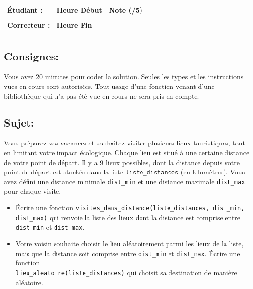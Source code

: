 \documentclass[a4paper,11pt]{article}
\begin{document}
\begin{table}[h!]
\centering
\renewcommand{\arraystretch}{1.4} %
\begin{tabular}{|p{10cm}|p{3cm}|p{2cm}|}
\hline
\textbf{Étudiant :} & \textbf{Heure Début }  & \textbf{Note (/5) }  \\
& & \\
\hline
\textbf{Correcteur :} & \textbf{Heure Fin } & \\
& & \\
\hline

\hline
\end{tabular}
\end{table}

\vspace*{-0.4 cm}
\subsection*{Consignes:} Vous avez 20 minutes pour coder la solution. Seules les types et les instructions vues en cours sont autorisées. Tout usage d'une fonction 
venant d'une bibliothèque qui n'a pas été vue en cours ne sera pris en compte. 

\vspace*{-0.2 cm}

\subsection*{Sujet:}   


Vous préparez vos vacances et souhaitez visiter plusieurs lieux touristiques, tout en limitant votre impact écologique.  
Chaque lieu est situé à une certaine distance de votre point de départ.  Il y a 9 lieux possibles, dont la distance depuis votre point de départ est stockée dans la liste \texttt{liste\_distances} (en kilomètres).  
Vous avez défini une distance minimale \texttt{dist\_min} et une distance maximale \texttt{dist\_max} pour chaque visite.

\begin{itemize}
\item[1.] Écrire une fonction 
\texttt{visites\_dans\_distance(liste\_distances, dist\_min, dist\_max)}  
qui renvoie la liste des lieux dont la distance est comprise entre \texttt{dist\_min} et \texttt{dist\_max}.
\item[2.] Votre voisin souhaite choisir le lieu aléatoirement parmi les lieux de la liste, mais que la distance soit comprise entre \texttt{dist\_min} et \texttt{dist\_max}.
Écrire une fonction \\
\texttt{lieu\_aleatoire(liste\_distances)} 
qui choisit sa destination de manière aléatoire. 
\end{itemize}
\end{document}
